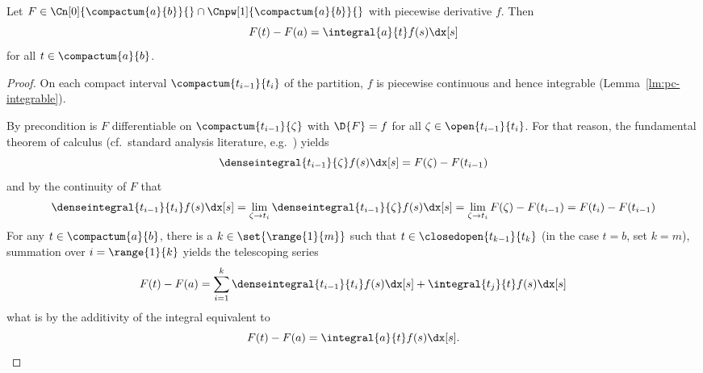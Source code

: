     \begin{lemma}\label{lm:pc-hauptsatz}
        Let $F\in\Cn[0]{\compactum{a}{b}}{} \cap \Cnpw[1]{\compactum{a}{b}}{}$
        with piecewise derivative $f$. Then
        \begin{equation*}
            F(t)-F(a) = \integral{a}{t} f(s)\dx[s]
        \end{equation*}
        for all $t\in\compactum{a}{b}$.
    \end{lemma}
    \begin{proof}
        On each compact interval $\compactum{t_{i-1}}{t_i}$ of the partition, $f$ is piecewise continuous and hence integrable (Lemma~\ref{lm:pc-integrable}).

        By precondition is $F$ differentiable on $\compactum{t_{i-1}}{\zeta}$ with $\D{F}=f$ for all $\zeta\in\open{t_{i-1}}{t_i}$.
        For that reason, the fundamental theorem of calculus (cf.\ standard analysis literature, e.g.~\cite{Gathmann12GDM,Rudin76PrinciplesAnalysis}) yields
        \begin{equation*}
            \denseintegral{t_{i-1}}{\zeta} f(s)\dx[s] = F(\zeta)-F(t_{i-1})
        \end{equation*}
        and by the continuity of $F$ that
        \begin{equation*}
            \denseintegral{t_{i-1}}{t_i} f(s)\dx[s]
            = \lim_{\zeta\to t_i}\denseintegral{t_{i-1}}{\zeta} f(s)\dx[s]
            = \lim_{\zeta\to t_i} F(\zeta)-F(t_{i-1})
            = F(t_i)-F(t_{i-1})
        \end{equation*}
        For any $t\in\compactum{a}{b}$, there is a $k\in\set{\range{1}{m}}$ such that $t\in\closedopen{t_{k-1}}{t_k}$ (in the case $t=b$, set $k=m$), summation over $i=\range{1}{k}$ yields the telescoping series
        \begin{equation*}
            F(t)-F(a) = \sum_{i=1}^{k} \denseintegral{t_{i-1}}{t_i} f(s)\dx[s] + \integral{t_j}{t} f(s)\dx[s]
        \end{equation*}
        what is by the additivity of the integral equivalent to
        \begin{equation*}
            F(t)-F(a) = \integral{a}{t} f(s)\dx[s].
        \end{equation*}
    \end{proof}


